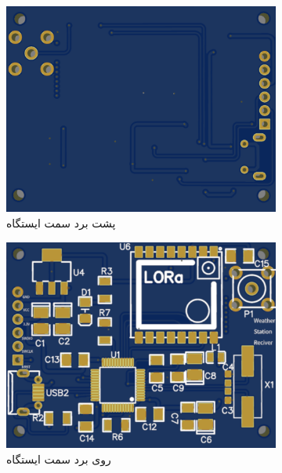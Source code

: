 
\begin{figure}[!h]
	\begin{subfigure}[b]{0.5\textwidth}
		\includegraphics[width=\linewidth]{Assets/receiverBack.png}
		\caption{پشت برد سمت ایستگاه}
		\label{fig:receiverBack}
	\end{subfigure}
	\begin{subfigure}[b]{0.5\textwidth}
		\includegraphics[width=\linewidth]{Assets/receiverFront.png}
		\caption{روی برد سمت ایستگاه}
		\label{fig:receiverFront}
	\end{subfigure}
	\begin{subfigure}[b]{0.5\textwidth}

\end{subfigure}
\end{figure}
